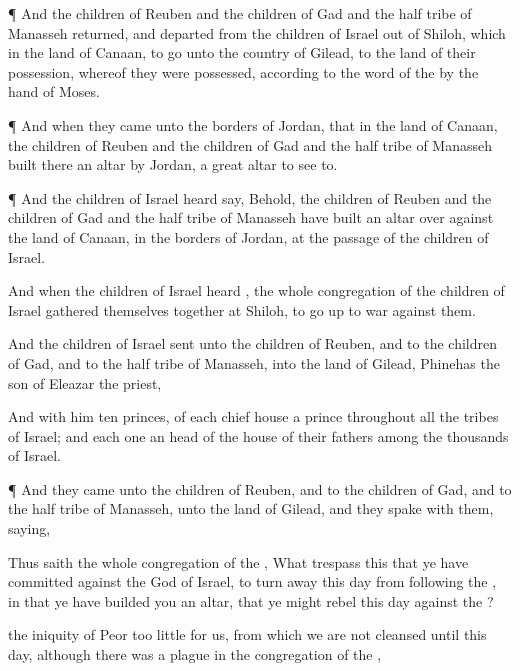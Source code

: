 {\par }{\PP {}¶ And the
children of
Reuben and the
children of
Gad and the
half
tribe of
Manasseh
returned, and
departed from the
children of
Israel out of
Shiloh, which
{} in the
land of
Canaan, to
go unto the
country of
Gilead, to the
land of their
possession, whereof they were
possessed, according to the
word of the
{} by the
hand of
Moses.


\par }{\PP {}¶ And when they
came unto the
borders of
Jordan, that
{} in the
land of
Canaan, the
children of
Reuben and the
children of
Gad and the
half
tribe of
Manasseh
built there an
altar by
Jordan, a
great
altar to see
to.


\par }{\PP {}¶ And the
children of
Israel
heard
say, Behold, the
children of
Reuben and the
children of
Gad and the
half
tribe of
Manasseh have
built an
altar over
against the
land of
Canaan, in the
borders of
Jordan, at the
passage of the
children of
Israel.

And when the
children of
Israel
heard
{}, the whole
congregation of the
children of
Israel gathered themselves
together at
Shiloh, to go
up to
war against them.

And the
children of
Israel
sent unto the
children of
Reuben, and to the
children of
Gad, and to the
half
tribe of
Manasseh, into the
land of
Gilead,
Phinehas the
son of
Eleazar the
priest,

And with him
ten
princes, of
each
chief
house a
prince throughout all the
tribes of
Israel; and each
one
{} an
head of the
house of their
fathers among the
thousands of
Israel.


\par }{\PP {}¶ And they
came unto the
children of
Reuben, and to the
children of
Gad, and to the
half
tribe of
Manasseh, unto the
land of
Gilead, and they
spake with them,
saying,

Thus
saith the whole
congregation of the
{}, What
trespass
{} this that ye have
committed against the
God of
Israel, to turn
away this
day from
following the
{}, in that ye have
builded you an
altar, that ye might
rebel this
day against the
{}?

 the
iniquity of
Peor too
little for us, from which we are not
cleansed until this
day, although there was a
plague in the
congregation of the
{},

}
